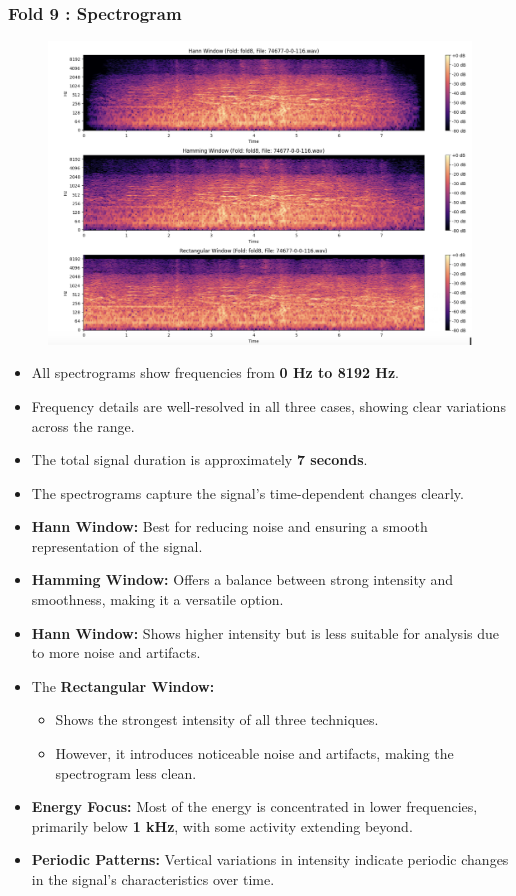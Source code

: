 \documentclass[a4paper,12pt]{article}
\begin{document}
    \subsubsection{Fold 9 : Spectrogram}
    \begin{figure}[H]
        \centering
        \includegraphics[width=1\linewidth]{Fold9.png}
    \end{figure}
    \begin{itemize}
        \item All spectrograms show frequencies from  \textbf{0 Hz to 8192 Hz}.
        \item Frequency details are well-resolved in all three cases, showing clear variations across the range.
        \item The total signal duration is approximately  \textbf{7 seconds}.
        \item The spectrograms capture the signal's time-dependent changes clearly.
        \item \textbf{Hann Window:} Best for reducing noise and ensuring a smooth representation of the signal.
        \item \textbf{Hamming Window:} Offers a balance between strong intensity and smoothness, making it a versatile option.
        \item \textbf{Hann Window:} Shows higher intensity but is less suitable for analysis due to more noise and artifacts.
        \item The \textbf{Rectangular Window:}
            \begin{itemize}
                \item Shows the strongest intensity of all three techniques.
                \item However, it introduces noticeable noise and artifacts, making the spectrogram less clean.
            \end{itemize}
        \item \textbf{Energy Focus:} Most of the energy is concentrated in lower frequencies, primarily below \textbf{1 kHz}, with some activity extending beyond.
        \item \textbf{Periodic Patterns:} Vertical variations in intensity indicate periodic changes in the signal's characteristics over time.
    \end{itemize}
\newpage
\end{document}
